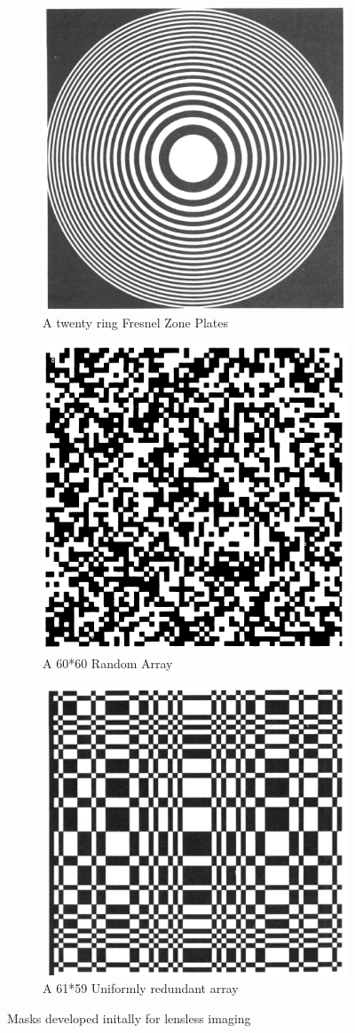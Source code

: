 \begin{figure}[ht]
\centering
\begin{subfigure}{0.75\textwidth}
  \centering
  \includegraphics[width=0.50\linewidth]{pics/fzp}
  \caption{A twenty ring Fresnel Zone Plates}
  \label{fig:fzp}
\end{subfigure}
\hfill
\begin{subfigure}{\textwidth}
  \centering
  \includegraphics[width=0.50\linewidth]{pics/random_array}
  \caption{A 60*60 Random Array}
  \label{fig:random_array}
\end{subfigure}
\hfill
\begin{subfigure}{\textwidth}
  \centering
  \includegraphics[width=0.50\linewidth]{pics/ura}
  \caption{A 61*59 Uniformly redundant array}
  \label{fig:ura}
\end{subfigure}

\caption{Masks developed initally for lensless imaging\cite{Cannon1}}
\label{fig:lensvslensless}
\end{figure}

